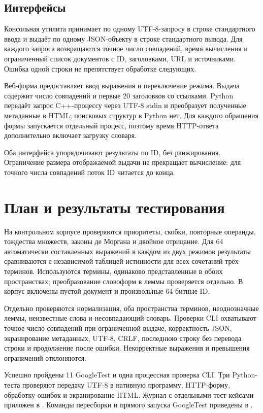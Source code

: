 \documentclass[12pt,a4paper]{article}
\begin{document}
\subsection{Интерфейсы}
Консольная утилита принимает по одному UTF-8-запросу в строке
стандартного ввода и выдаёт по одному JSON-объекту в строке
стандартного вывода. Для каждого запроса возвращаются точное число
совпадений, время вычисления и ограниченный список документов
с ID, заголовками, URL и источниками.
Ошибка одной строки не препятствует обработке следующих.

Веб-форма предоставляет ввод выражения и переключение режима.
Выдача содержит число совпадений и первые 20 заголовков со ссылками.
Python передаёт запрос C++-процессу через UTF-8 stdin и преобразует
полученные метаданные в HTML; поисковых структур в Python нет.
Для каждого обращения формы запускается отдельный процесс,
поэтому время HTTP-ответа дополнительно включает загрузку словаря.

Оба интерфейса упорядочивают результаты по ID, без ранжирования.
Ограничение размера отображаемой выдачи не прекращает вычисление:
для точного числа совпадений поток ID читается до конца.

\section{План и результаты тестирования}
На контрольном корпусе проверяются приоритеты, скобки, повторные
операнды, тождества множеств, законы де Моргана и двойное отрицание.
Для 64 автоматически составленных выражений в каждом из двух режимов
результаты сравниваются с независимой таблицей истинности для всех
сочетаний трёх терминов. Используются термины, одинаково представленные
в обоих пространствах; преобразование словоформ в леммы проверяется отдельно.
В корпус включены пустой документ и произвольные 64-битные ID.

Отдельно проверяются нормализация, оба пространства терминов,
неоднозначные леммы, неизвестные слова и несовпадающий словарь.
Проверки CLI охватывают точное число совпадений при ограниченной выдаче,
корректность JSON, экранирование метаданных, UTF-8, CRLF,
последнюю строку без перевода строки и продолжение после ошибки.
Некорректные выражения и превышения ограничений отклоняются.

Успешно пройдены 11 GoogleTest и одна процессная проверка CLI.
Три Python-теста проверяют передачу UTF-8 в нативную программу,
HTTP-форму, обработку ошибок и экранирование HTML.
Журнал с отдельными тест-кейсами приложен в .
Команды пересборки и прямого запуска GoogleTest приведены
в .
\end{document}

